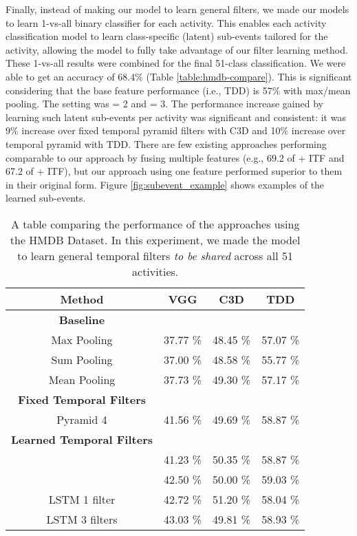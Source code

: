 \documentclass[letterpaper]{article}
\begin{document}
Finally, instead of making our model to learn general filters, we made our models to learn 1-vs-all binary classifier for each activity. This enables each activity classification model to learn class-specific (latent) sub-events tailored for the activity, allowing the model to fully take advantage of our filter learning method. These 1-vs-all results were combined for the final 51-class classification. We were able to get an accuracy of 68.4\% (Table \ref{table:hmdb-compare}). This is significant considering that the base feature performance (i.e., TDD) is 57\% with max/mean pooling. The setting was  = 2 and  = 3. The performance increase gained by learning such latent sub-events per activity was significant and consistent: it was 9\% increase over fixed temporal pyramid filters with C3D and 10\% increase over temporal pyramid with TDD. There are few existing approaches performing comparable to our approach by fusing multiple features (e.g., 69.2 of 
\cite{feichtenhofer2016} + ITF and 67.2 of \cite{varol16} + ITF), but our approach using one feature performed superior to them in their original form. Figure \ref{fig:subevent_example} shows examples of the learned sub-events.






\begin{table}[]
\small
\caption{A table comparing the performance of the approaches using the HMDB Dataset. In this experiment, we made the model to learn general temporal filters \emph{to be shared} across all 51 activities.}
\label{table:hmdb_results}

\center
\setlength\extrarowheight{0pt}
\begin{tabular}{c|c|c|c}\hline
Method       &  VGG & C3D & TDD \\\hline
\textbf{Baseline}       \\\hline
Max Pooling  &  37.77 \% &  48.45 \%  &  57.07 \%  \\
Sum Pooling  &  37.00 \% &  48.58 \%  &  55.77 \%   \\
Mean Pooling &  37.73 \% &  49.30 \%  &  57.17 \%  \\\hline
\textbf{Fixed Temporal Filters}       \\\hline
Pyramid 4  &  41.56 \%   & 49.69 \%  &  58.87 \%\\\hline
\textbf{Learned Temporal Filters}       \\\hline
           &  41.23 \%  & 50.35 \%  &  58.87 \% \\
           &  42.50 \%  & 50.00 \%  &  59.03 \%  \\
LSTM 1 filter   &  42.72 \%  & 51.20 \%  &  58.04 \%  \\
LSTM 3 filters  &  43.03 \%  & 49.81 \%  &  58.93 \%  \\\hline
\end{tabular}
\end{table}
\end{document}
